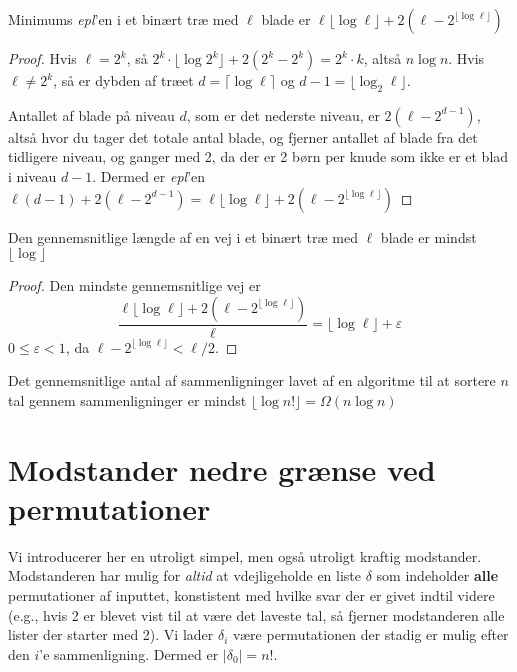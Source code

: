 \begin{lemma}
Minimums \textit{epl}'en i et binært træ med $\ell$ blade er $\ell \lfloor \log \ell \rfloor + 2 ( \ell - 2^{\lfloor \log \ell \rfloor} )$
\end{lemma}

\begin{proof}
  Hvis $\ell = 2^{k}$, så $2^{k} \cdot \lfloor \log 2^{k} \rfloor + 2(2^{k} - 2^{k}) = 2^{k} \cdot k $, altså $n \log n$. Hvis $\ell \ne 2^{k}$, så er dybden af træet $d = \lceil \log \ell \rceil $ og $d-1 = \lfloor \log_{2} \ell \rfloor$.

  Antallet af blade på niveau $d$, som er det nederste niveau, er $2(\ell - 2^{d-1})$, altså hvor du tager det totale antal blade, og fjerner antallet af blade fra det tidligere niveau, og ganger med 2, da der er 2 børn per knude som ikke er et blad i niveau $d-1$. Dermed er \textit{epl}'en $\ell(d-1) + 2(\ell-2^{d-1}) = \ell \lfloor \log \ell \rfloor + 2(\ell - 2^{\lfloor \log \ell \rfloor})$
\end{proof}

\begin{lemma}
  Den gennemsnitlige længde af en vej i et binært træ med $\ell$ blade er mindst $\lfloor \log \rfloor$
\end{lemma}

\begin{proof}
  Den mindste gennemsnitlige vej er
  \begin{equation*}
\frac{\ell \lfloor \log \ell \rfloor + 2(\ell - 2^{\lfloor \log \ell \rfloor})}{\ell} = \lfloor \log \ell \rfloor + \varepsilon
  \end{equation*}
  $0 \le \varepsilon < 1 $, da $\ell - 2^{\lfloor \log \ell \rfloor} < \ell/2$.
\end{proof}

\begin{theorem}
Det gennemsnitlige antal af sammenligninger lavet af en algoritme til at sortere $n$ tal gennem sammenligninger er mindst $\lfloor \log n! \rfloor = \Omega(n \log n)$
\end{theorem}

\section{Modstander nedre grænse ved permutationer}%
\label{sec:label}

Vi introducerer her en utroligt simpel, men også utroligt kraftig modstander. Modstanderen har mulig for \textit{altid} at vdejligeholde en liste \(\delta\) som indeholder \textbf{alle} permutationer af inputtet, konstistent med hvilke svar der er givet indtil videre (e.g., hvis 2 er blevet vist til at være det laveste tal, så fjerner modstanderen alle lister der starter med 2). Vi lader \(\delta_{i}\) være permutationen der stadig er mulig efter den $i$'e sammenligning. Dermed er $|\delta_{0}| = n!$.


